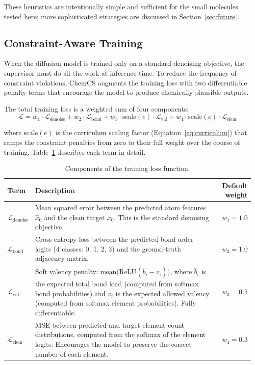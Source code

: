 \documentclass[11pt]{article}
\begin{document}
These heuristics are intentionally simple and sufficient for the small
molecules tested here; more sophisticated strategies are discussed in
Section~\ref{sec:future}.

\subsection{Constraint-Aware Training}
\label{sec:training}

When the diffusion model is trained only on a standard denoising
objective, the supervisor must do all the work at inference time. To
reduce the frequency of constraint violations, ChemCS augments the
training loss with two differentiable penalty terms that encourage the
model to produce chemically plausible outputs.

The total training loss is a weighted sum of four components:
\begin{equation}
\mathcal{L} = w_1 \cdot \mathcal{L}_{\text{denoise}}
  + w_2 \cdot \mathcal{L}_{\text{bond}}
  + w_3 \cdot \text{scale}(e) \cdot \mathcal{L}_{\text{val}}
  + w_4 \cdot \text{scale}(e) \cdot \mathcal{L}_{\text{elem}}
\label{eq:loss}
\end{equation}

\noindent
where $\text{scale}(e)$ is the curriculum scaling factor
(Equation~\ref{eq:curriculum}) that ramps the constraint penalties from
zero to their full weight over the course of training. Table~\ref{tab:loss}
describes each term in detail.

\begin{table}[H]
\centering
\caption{Components of the training loss function.}
\label{tab:loss}
\begin{tabular}{@{}lp{7.5cm}r@{}}
\toprule
Term & Description & Default weight \\
\midrule
$\mathcal{L}_{\text{denoise}}$ &
  Mean squared error between the predicted atom features $\hat{x}_0$ and
  the clean target $x_0$. This is the standard denoising objective. &
  $w_1 = 1.0$ \\[4pt]
$\mathcal{L}_{\text{bond}}$ &
  Cross-entropy loss between the predicted bond-order logits
  (4 classes: 0, 1, 2, 3) and the ground-truth adjacency matrix. &
  $w_2 = 1.0$ \\[4pt]
$\mathcal{L}_{\text{val}}$ &
  Soft valency penalty:
  $\text{mean}\bigl(\text{ReLU}(\hat{b}_i - v_i)\bigr)$, where
  $\hat{b}_i$ is the expected total bond load (computed from softmax bond
  probabilities) and $v_i$ is the expected allowed valency (computed from
  softmax element probabilities). Fully differentiable. &
  $w_3 = 0.5$ \\[4pt]
$\mathcal{L}_{\text{elem}}$ &
  MSE between predicted and target element-count distributions, computed
  from the softmax of the element logits. Encourages the model to
  preserve the correct number of each element. &
  $w_4 = 0.3$ \\
\bottomrule
\end{tabular}
\end{table}
\end{document}
